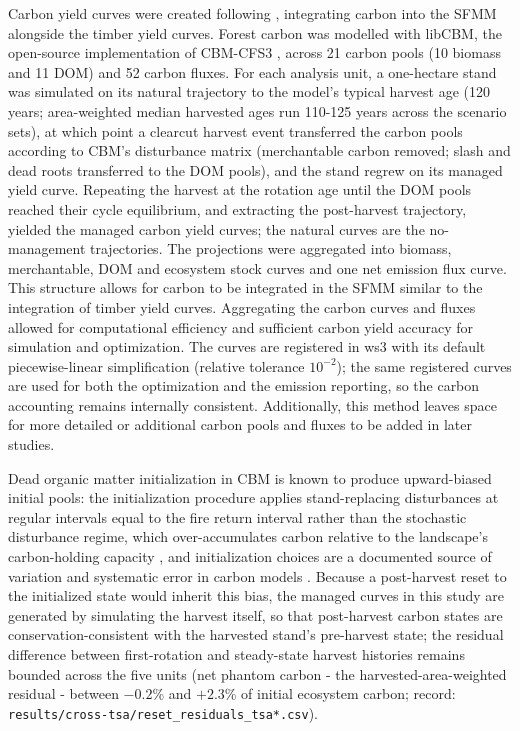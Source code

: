\documentclass[preprint,12pt,authoryear]{elsarticle}
\begin{document}
\begin{linenumbers}
Carbon yield curves were created following \citep{neilson2008optimal}, integrating carbon into the \ac{SFMM} alongside the timber yield curves. Forest carbon was modelled with libCBM, the open-source implementation of \ac{CBM-CFS3} \citep{KURZ2009480}, across 21 carbon pools (10 biomass and 11 \ac{DOM}) and 52 carbon fluxes. For each analysis unit, a one-hectare stand was simulated on its natural trajectory to the model's typical harvest age (120 years; area-weighted median harvested ages run 110-125 years across the scenario sets), at which point a clearcut harvest event transferred the carbon pools according to CBM's disturbance matrix (merchantable carbon removed; slash and dead roots transferred to the \ac{DOM} pools), and the stand regrew on its managed yield curve. Repeating the harvest at the rotation age until the \ac{DOM} pools reached their cycle equilibrium, and extracting the post-harvest trajectory, yielded the managed carbon yield curves; the natural curves are the no-management trajectories. The projections were aggregated into biomass, merchantable, \ac{DOM} and ecosystem stock curves and one net emission flux curve. This structure allows for carbon to be integrated in the \ac{SFMM} similar to the integration of timber yield curves. Aggregating the carbon curves and fluxes allowed for computational efficiency and sufficient carbon yield accuracy for simulation and optimization. The curves are registered in \ac{ws3} with its default piecewise-linear simplification (relative tolerance $10^{-2}$); the same registered curves are used for both the optimization and the emission reporting, so the carbon accounting remains internally consistent. Additionally, this method leaves space for more detailed or additional carbon pools and fluxes to be added in later studies. 

Dead organic matter initialization in CBM is known to produce upward-biased initial pools: the initialization procedure applies stand-replacing disturbances at regular intervals equal to the fire return interval rather than the stochastic disturbance regime, which over-accumulates carbon relative to the landscape's carbon-holding capacity \citep{boisvenue2022managing}, and initialization choices are a documented source of variation and systematic error in carbon models \citep{metsaranta2017, oberpriller2021}. Because a post-harvest reset to the initialized state would inherit this bias, the managed curves in this study are generated by simulating the harvest itself, so that post-harvest carbon states are conservation-consistent with the harvested stand's pre-harvest state; the residual difference between first-rotation and steady-state harvest histories remains bounded across the five units (net phantom carbon - the harvested-area-weighted residual - between $-0.2$\% and $+2.3$\% of initial ecosystem carbon; record: \texttt{results/cross-tsa/reset\_residuals\_tsa*.csv}). 


\end{linenumbers}
\end{document}
